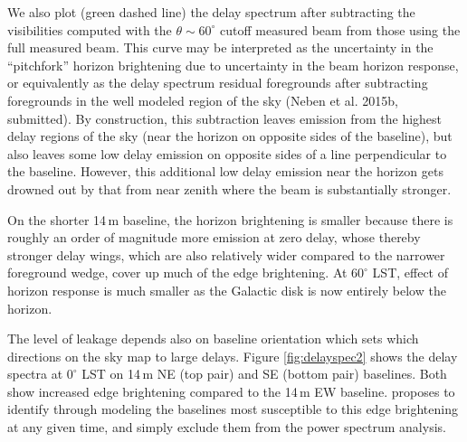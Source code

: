 \documentclass{emulateapj}
\begin{document}
We also plot (green dashed line) the delay spectrum after subtracting the visibilities computed with the $\theta\sim60^\circ$ cutoff measured beam from those using the full measured beam. This curve may be interpreted as the uncertainty in the ``pitchfork'' horizon brightening due to uncertainty in the beam horizon response, or equivalently as the delay spectrum residual foregrounds after subtracting foregrounds in the well modeled region of the sky (Neben et al. 2015b, submitted). By construction, this subtraction leaves emission from the highest delay regions of the sky (near the horizon on opposite sides of the baseline), but also leaves some low delay emission on opposite sides of a line perpendicular to the baseline. However, this additional low delay emission near the horizon gets drowned out by that from near zenith where the beam is substantially stronger. 

On the shorter 14\,m baseline, the horizon brightening is smaller because there is roughly an order of magnitude more emission at zero delay, whose thereby stronger delay wings, which are also relatively wider compared to the narrower foreground wedge, cover up much of the edge brightening. At $60^\circ$ LST, effect of horizon response is much smaller as the Galactic disk is now entirely below the horizon. 

The level of leakage depends also on baseline orientation which sets which directions on the sky map to large delays. Figure \ref{fig:delayspec2} shows the delay spectra at $0^\circ$ LST on 14\,m NE (top pair) and SE (bottom pair) baselines. Both show increased edge brightening compared to the 14\,m EW baseline. \citet{nithya15} proposes to identify through modeling the baselines most susceptible to this edge brightening at any given time, and simply exclude them from the power spectrum analysis. 
\end{document}
